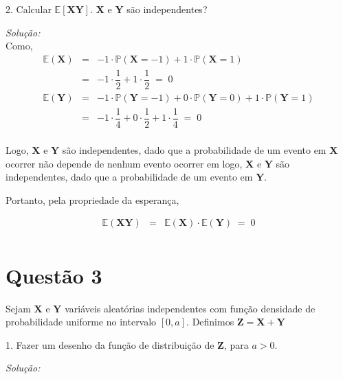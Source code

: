\documentclass[a4paper, 11pt]{article}
\begin{document}
2. Calcular $\mathds{E}[\mathbf{X}\mathbf{Y}]$. $\mathbf{X}$ e $\mathbf{Y}$ são independentes?

\noindent
\textit{Solução:} \\

Como,
\begin{equation*}
\begin{array}{lclllll}
\mathds{E}(\mathbf{X}) & = & -1 \cdot \mathds{P}(\mathbf{X} = -1) + 1 \cdot \mathds{P}(\mathbf{X} = 1)\\ 
& = & -1 \cdot \dfrac{1}{2} + 1 \cdot \dfrac{1}{2} \; = \; 0\\

\mathds{E}(\mathbf{Y}) & = & -1 \cdot \mathds{P}(\mathbf{Y} = -1) + 0 \cdot \mathds{P}(\mathbf{Y} = 0) + 1 \cdot \mathds{P}(\mathbf{Y} = 1)\\ 
& = & -1 \cdot \dfrac{1}{4} + 0 \cdot \dfrac{1}{2} + 1 \cdot \dfrac{1}{4} \; = \; 0\\

\end{array}
\end{equation*}

Logo, $\mathbf{X}$ e $\mathbf{Y}$ são independentes, dado que a probabilidade de um evento em $\mathbf{X}$ ocorrer não depende de nenhum evento ocorrer em logo, $\mathbf{X}$ e $\mathbf{Y}$ são independentes, dado que a probabilidade de um evento em $\mathbf{Y}$.

Portanto, pela propriedade da esperança,

\begin{equation*}
\begin{array}{lclllll}
\mathds{E}(\mathbf{XY}) & = & \mathds{E}(\mathbf{X})\cdot\mathds{E}(\mathbf{Y}) \; = \; 0 \\ 
\end{array}
\end{equation*}

\section*{Questão 3}

Sejam $\mathbf{X}$ e $\mathbf{Y}$ variáveis aleatórias independentes com função densidade de probabilidade uniforme no intervalo $[0,a]$. Definimos $\mathbf{Z} = \mathbf{X} + \mathbf{Y}$

1. Fazer um desenho da função de distribuição de $\mathbf{Z}$, para $a>0$.

\noindent
\textit{Solução:} \\
\end{document}
